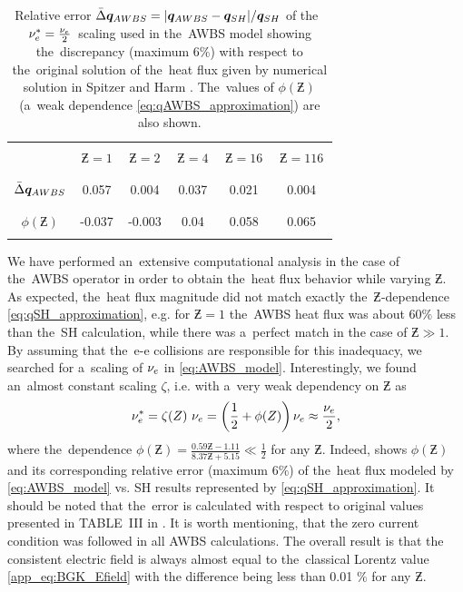 \begin{table}
\begin{center}
  \begin{tabular}{c|ccccc}
    \hline\hline\\
    & $\,\Zbar=1\,$ & $\,\Zbar=2\,$ & $\,\Zbar=4\,$ & $\,\Zbar=16\,$ & $\,\Zbar=116\,$ \\\\
    \hline\\
    $\bar{\Delta}\boldsymbol{q}_{AWBS}$ & 0.057 & 0.004 & 0.037 & 0.021 & 0.004 \\\\
    \hline\\
    $\phi(\Zbar)$ & -0.037 & -0.003 & 0.04 & 0.058 & 0.065 \\\\ 
    \hline\hline
  \end{tabular}
  \caption{
  Relative error $\bar{\Delta}\boldsymbol{q}_{AWBS} = 
  |\boldsymbol{q}_{AWBS} - \boldsymbol{q}_{SH}| / \boldsymbol{q}_{SH}$ of 
  the~$\nu_{e}^* = \frac{\nu_{e}}{2}$~scaling used in the~AWBS model
   showing the~discrepancy 
  (maximum 6$\%$) with respect to the~original solution of 
  the~heat flux given by numerical solution in Spitzer and Harm 
  \cite{SpitzerHarm_PR1953}. The~values of $\phi(\Zbar)$ (a~weak dependence 
  \eqref{eq:qAWBS_approximation}) are also shown. 
  }
\label{tab:qAWBS}
\end{center}
\end{table}

We have performed an~extensive computational analysis in the case of 
the~AWBS operator in order to obtain the~heat flux behavior while varying 
$\Zbar$. As expected, the~heat flux magnitude did not match exactly 
the~$\Zbar$-dependence \eqref{eq:qSH_approximation}, e.g. for $\Zbar=1$
the~AWBS heat flux was about 60$\%$ less than the~SH calculation, while
there was a~perfect match in the case of $\Zbar\gg1$. By assuming that the~e-e
collisions are responsible for this inadequacy, we searched for a~scaling of
$\nu_{e}$ in \eqref{eq:AWBS_model}. Interestingly, we found an~almost constant
scaling $\zeta$, i.e. with a~very weak dependency on $\Zbar$ as  
\begin{equation}
  \nu_{e}^* = \zeta(Z)~\nu_{e} 
  = \left(\frac{1}{2} + \phi(Z)\right) \nu_{e} \approx \frac{\nu_{e}}{2} ,
  \label{eq:qAWBS_approximation}
\end{equation}
where the~dependence $\phi(\Zbar) = \frac{0.59 \Zbar - 1.11}{8.37 \Zbar + 5.15} \ll\frac{1}{2}$ for any $\Zbar$.
Indeed,  shows $\phi(\Zbar)$ and its corresponding relative
error (maximum 6$\%$) of the~heat flux modeled by 
\eqref{eq:AWBS_model} vs. SH results represented by 
\eqref{eq:qSH_approximation}. It should be noted that the~error is calculated 
with respect to original values presented in TABLE~III in 
\cite{SpitzerHarm_PR1953}. It is worth mentioning, that the zero current 
condition was followed in all AWBS calculations. The overall result is that
the consistent electric field is always almost equal to the~classical Lorentz
value \eqref{app_eq:BGK_Efield} with the difference being less than 0.01 $\%$ 
for any $\Zbar$. 
 
